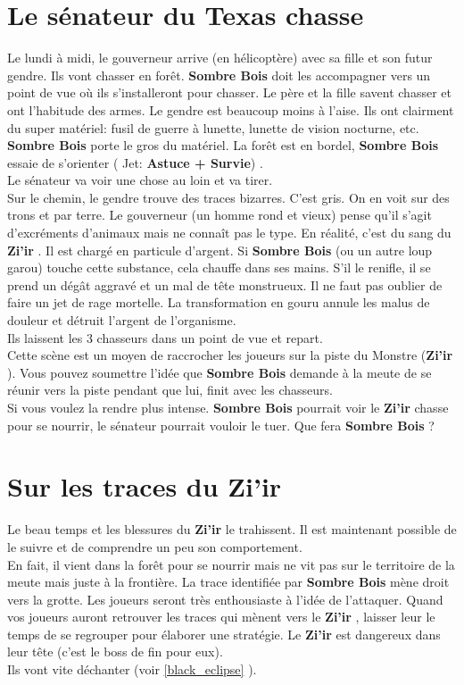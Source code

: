 \documentclass[oneside,12pt]{book}
\newcommand\roll[1]{
( Jet: \textbf{#1})
}
\newcommand{\Leonard}{\textbf{Sombre Bois} }
\newcommand{\Thomas}{\textbf{Zi'ir} }
\begin{document}
\begin{flushleft}
\section{Le sénateur du Texas chasse}
Le lundi à midi, le gouverneur arrive (en hélicoptère) avec sa fille et son futur gendre. Ils vont chasser en forêt. 
\Leonard doit les accompagner vers un point de vue où ils s'installeront pour chasser. 
Le père et la fille savent chasser et ont l'habitude des armes. Le gendre est beaucoup moins à l'aise. 
Ils ont clairment du super matériel: fusil de guerre à lunette, lunette de vision nocturne, etc.
\Leonard porte le gros du matériel.
La forêt est en bordel, \Leonard essaie de s'orienter \roll{Astuce + Survie}. \\
Le sénateur va voir une chose au loin et va tirer. \\
Sur le chemin, le gendre trouve des traces bizarres. C'est gris. On en voit sur des trons et par terre. 
Le gouverneur (un homme rond et vieux) pense qu'il s'agit d'excréments d'animaux mais ne connaît pas le type. 
En réalité, c'est du sang du \Thomas. Il est chargé en particule d'argent. 
Si \Leonard (ou un autre loup garou) touche cette substance, cela chauffe dans ses mains. 
S'il le renifle, il se prend un dégât aggravé et un mal de tête monstrueux. 
Il ne faut pas oublier de faire un jet de rage mortelle. 
La transformation en gouru annule les malus de douleur et détruit l'argent de l'organisme.\\
Ils laissent les 3 chasseurs dans un point de vue et repart.\\
Cette scène est un moyen de raccrocher les joueurs sur la piste du Monstre (\Thomas). 
Vous pouvez soumettre l'idée que \Leonard demande à la meute de se réunir vers la piste pendant que lui, finit avec les chasseurs. \\
Si vous voulez la rendre plus intense. \Leonard pourrait voir le \Thomas chasse pour se nourrir, le sénateur pourrait vouloir le tuer. Que fera \Leonard ?


\section{Sur les traces du \Thomas}
Le beau temps et les blessures du \Thomas le trahissent. Il est maintenant possible de le suivre et de comprendre un peu son comportement.\\
En fait, il vient dans la forêt pour se nourrir mais ne vit pas sur le territoire de la meute mais juste à la frontière. La trace identifiée par \Leonard mène droit vers la grotte. 
Les joueurs seront très enthousiaste à l'idée de l'attaquer.
Quand vos joueurs auront retrouver les traces qui mènent vers le \Thomas, laisser leur le temps de se regrouper pour élaborer une stratégie. 
Le \Thomas est dangereux dans leur tête (c'est le boss de fin pour eux). \\
Ils vont vite déchanter (voir \ref{black_eclipse} ). 



\end{flushleft}
\end{document}
